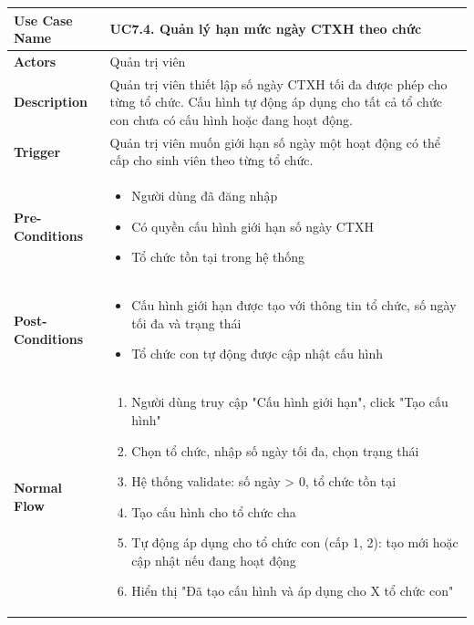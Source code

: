     \newpage
    \begin{table}[H]
    \renewcommand{\arraystretch}{1.3}
    \begin{tabular}{|m{}|m{}|}
    \hline
    \textbf{Use Case Name} 
    & \textbf{UC7.4. Quản lý hạn mức ngày CTXH theo chức} \\ \hline

\textbf{Actors} 
& Quản trị viên \\ \hline

\textbf{Description}
    & Quản trị viên thiết lập số ngày CTXH tối đa được phép cho từng tổ chức. Cấu hình tự động áp dụng cho tất cả tổ chức con chưa có cấu hình hoặc đang hoạt động.
    \\ \hline

    \textbf{Trigger} 
    & Quản trị viên muốn giới hạn số ngày một hoạt động có thể cấp cho sinh viên theo từng tổ chức.
    \\ \hline

    \textbf{Pre-Conditions} 
    & \begin{itemize}
        \item Người dùng đã đăng nhập
        \item Có quyền cấu hình giới hạn số ngày CTXH
        \item Tổ chức tồn tại trong hệ thống
    \end{itemize}
    \\ \hline

    \textbf{Post-Conditions} 
    & \begin{itemize}
        \item Cấu hình giới hạn được tạo với thông tin tổ chức, số ngày tối đa và trạng thái
        \item Tổ chức con tự động được cập nhật cấu hình
    \end{itemize}
    \\ \hline

    \textbf{Normal Flow} 
    & 
    \begin{enumerate}
        \item Người dùng truy cập "Cấu hình giới hạn", click "Tạo cấu hình"
        \item Chọn tổ chức, nhập số ngày tối đa, chọn trạng thái
        \item Hệ thống validate: số ngày > 0, tổ chức tồn tại
        \item Tạo cấu hình cho tổ chức cha
        \item Tự động áp dụng cho tổ chức con (cấp 1, 2): tạo mới hoặc cập nhật nếu đang hoạt động
        \item Hiển thị "Đã tạo cấu hình và áp dụng cho X tổ chức con"
    \end{enumerate}
    \\ \hline


\end{tabular}
\end{table}

